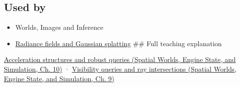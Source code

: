 \subsection{Used by}\label{appendix-0b426c47dd78-used-by}

\hypertarget{appendix-0b426c47dd78-used-by}{}

\begin{itemize}
\item
  {Worlds, Images and Inference}
\item
  \hyperref[appendix-c5b332e400e7]{Radiance fields and Gaussian splatting} \#\# Full teaching explanation
\end{itemize}

\href{../05-Spatial-Worlds-Engine-State-and-Simulation/main.pdf\#nameddest=04-visual-computing-ii-ch029-acceleration-structures-and-robust-queries-1}{Acceleration structures and robust queries (Spatial Worlds, Engine State, and Simulation, Ch. 10)} · \href{../05-Spatial-Worlds-Engine-State-and-Simulation/main.pdf\#nameddest=04-visual-computing-ii-ch028-visibility-queries-and-ray-intersections-1}{Visibility queries and ray intersections (Spatial Worlds, Engine State, and Simulation, Ch. 9)}
